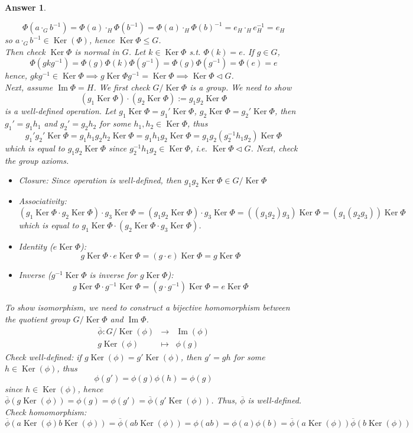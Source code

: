 \documentclass[a4paper]{article}
\DeclareMathOperator{\normal}{\lhd}
\DeclareMathOperator{\Ker}{Ker}
\DeclareMathOperator{\im}{Im}
\newtheorem{ans}{Answer}[section]
\theoremstyle{new}
\begin{document}
\begin{ans}
\begin{enumerate}[label=(\roman*)]
$$\Phi(a\cdot_Gb^{-1})=\Phi(a)\cdot_H\Phi(b^{-1})=\Phi(a)\cdot_H\Phi(b)^{-1}=e_H\cdot_He_H^{-1}=e_H$$
so $a\cdot_Gb^{-1}\in\Ker(\Phi)$, hence $\Ker\Phi\leq G$.\\[5pt]
Then check $\Ker\Phi$ is normal in $G$. Let $k\in\Ker\Phi$ s.t. $\Phi(k)=e$. If $g\in G$,
$$\Phi(gkg^{-1})=\Phi(g)\Phi(k)\Phi(g^{-1})=\Phi(g)\Phi(g^{-1})=\Phi(e)=e$$
hence, $gkg^{-1}\in\Ker\Phi\implies g\Ker\Phi g^{-1}=\Ker\Phi\implies\Ker\Phi\normal G$.\\[5pt]
Next, assume $\im\Phi=H$. We first check $G/\Ker\Phi$ is a group. We need to show
$$(g_1\Ker\Phi)\cdot(g_2\Ker\Phi):=g_1g_2\Ker\Phi$$
is a well-defined operation. Let $g_1\Ker\Phi=g_1'\Ker\Phi$, $g_2\Ker\Phi=g_2'\Ker\Phi$, then $g_1'=g_1h_1$ and $g_2'=g_2h_2$ for some $h_1,h_2\in\Ker\Phi$, thus
$$g_1'g_2'\Ker\Phi=g_1h_1g_2h_2\Ker\Phi=g_1h_1g_2\Ker\Phi=g_1g_2(g_2^{-1}h_1g_2)\Ker\Phi$$
which is equal to $g_1g_2\Ker\Phi$ since $g_2^{-1}h_1g_2\in \Ker\Phi$, i.e. $\Ker\Phi\normal G$. Next, check the group axioms. 
\begin{itemize}
\item Closure: Since operation is well-defined, then $g_1g_2\Ker\Phi\in G/\Ker\Phi$
\item Associativity: $$(g_1\Ker\Phi\cdot g_2\Ker\Phi)\cdot g_3\Ker\Phi=(g_1g_2\Ker\Phi)\cdot g_3\Ker\Phi=((g_1g_2)g_3)\Ker\Phi=(g_1(g_2g_3))\Ker\Phi$$
which is equal to $g_1\Ker\Phi\cdot(g_2\Ker\Phi\cdot g_3\Ker\Phi)$. 
\item Identity ($e\Ker\Phi$): $$g\Ker\Phi\cdot e\Ker\Phi=(g\cdot e)\Ker\Phi=g\Ker\Phi$$
\item Inverse ($g^{-1}\Ker\Phi$ is inverse for $g\Ker\Phi$): $$g\Ker\Phi\cdot g^{-1}\Ker\Phi=(g\cdot g^{-1})\Ker\Phi=e\Ker\Phi$$
\end{itemize}
To show isomorphism, we need to construct a bijective homomorphism between the quotient group $G/\Ker\Phi$ and $\im\Phi$.
\begin{eqnarray}
\overline{\phi}:G/\Ker(\phi)&\rightarrow&\im(\phi)\nonumber\\g\Ker(\phi)&\mapsto&\phi(g)\nonumber
\end{eqnarray}
Check well-defined: if $g\Ker(\phi)=g'\Ker(\phi)$, then $g'=gh$ for some $h\in\Ker(\phi)$, thus
$$\phi(g')=\phi(g)\phi(h)=\phi(g)$$
since $h\in\Ker(\phi)$, hence $\overline{\phi}(g\Ker(\phi))=\phi(g)=\phi(g')=\overline{\phi}(g'\Ker(\phi))$. Thus, $\overline{\phi}$ is well-defined. Check homomorphism:
$$\overline{\phi}(a\Ker(\phi)b\Ker(\phi))=\overline{\phi}(ab\Ker(\phi))=\phi(ab)=\phi(a)\phi(b)=\overline{\phi}(a\Ker(\phi))\overline{\phi}(b\Ker(\phi))$$

\end{enumerate}
\end{ans}
\end{document}
